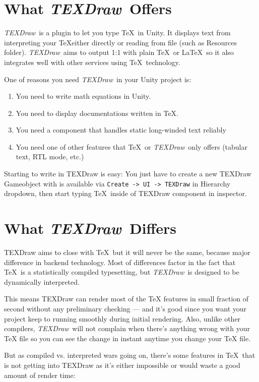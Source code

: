 \documentclass[12pt]{article}
\def\TEXDraw{\textit{TEXDraw}}
\begin{document}
	 \section{What \TEXDraw\ Offers}
	 
	 \TEXDraw\ is a plugin to let you type \TeX\ in Unity. It displays text from interpreting your \TeX either directly or reading from file (such as Resources folder). \TEXDraw\ aims to output 1:1 with plain \TeX\ or \LaTeX\ so it also integrates well with other services using \TeX\ technology.
	 
	 One of reasons you need \TEXDraw\ in your Unity project is:
 	\begin{enumerate}
 		\item You need to write math equations in Unity.
 		\item You need to display documentations written in \TeX.
 		\item You need a component that handles static long-winded text reliably
 		\item You need one of other features that \TeX\ or \TEXDraw\ only offers (tabular text, RTL mode, etc.)
 	\end{enumerate}
 
 	Starting to write in TEXDraw is easy: You just have to create a new TEXDraw Gameobject with is available via \verb|Create -> UI -> TEXDraw| in Hierarchy dropdown, then start typing \TeX\ inside of TEXDraw component in inspector.
 	
 	\section{What \TEXDraw\ Differs}
 	
 	TEXDraw aims to close with \TeX\ but it will never be the same, because major difference in backend technology. Most of differences factor in the fact that \TeX\ is a statistically compiled typesetting, but \TEXDraw\ is designed to be dynamically interpreted. 
 	
 	This means TEXDraw can render most of the TeX features in small fraction of second without any preliminary checking --- and it's good since you want your project keep to running smoothly during initial rendering. Also, unlike other compilers, \TEXDraw\ will not complain when there's anything wrong with your TeX file so you can see the change in instant anytime you change your TeX file.
 	
 	But as compiled vs. interpreted wars going on, there's some features in \TeX\ that is not getting into TEXDraw as it's either impossible or would waste a good amount of render time:
 	
\end{document}
